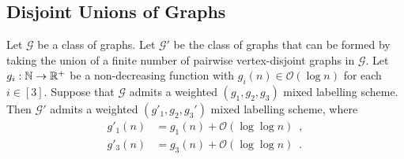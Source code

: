 \documentclass{patmorin}
\newcommand{\Oh}{\mathcal{O}}
\begin{document}
\subsection{Disjoint Unions of Graphs}

\begin{lem}\label{disjoint_union_ii}
    Let $\mathcal{G}$ be a class of graphs. Let $\mathcal{G}'$ be the class of graphs that can be formed by taking the union of a finite number of pairwise vertex-disjoint graphs in $\mathcal{G}$.
    Let $g_i:\mathbb{N}\to\mathbb{R}^+$ be a non-decreasing function  with $g_i(n)\in \Oh(\log n)$ for each $i\in[3]$.
    Suppose that $\mathcal{G}$ admits a weighted $(g_1,g_2,g_3)$ mixed labelling scheme.
    Then $\mathcal{G}'$ admits a weighted $(g'_1,g_2,g_3')$ mixed labelling scheme, where
    \begin{align*}
        g'_1(n) & = g_1(n)+\Oh(\log\log n)\enspace, \\
        g'_3(n) & = g_3(n)+\Oh(\log\log n) \enspace .
    \end{align*}
  \end{lem}
\end{document}
